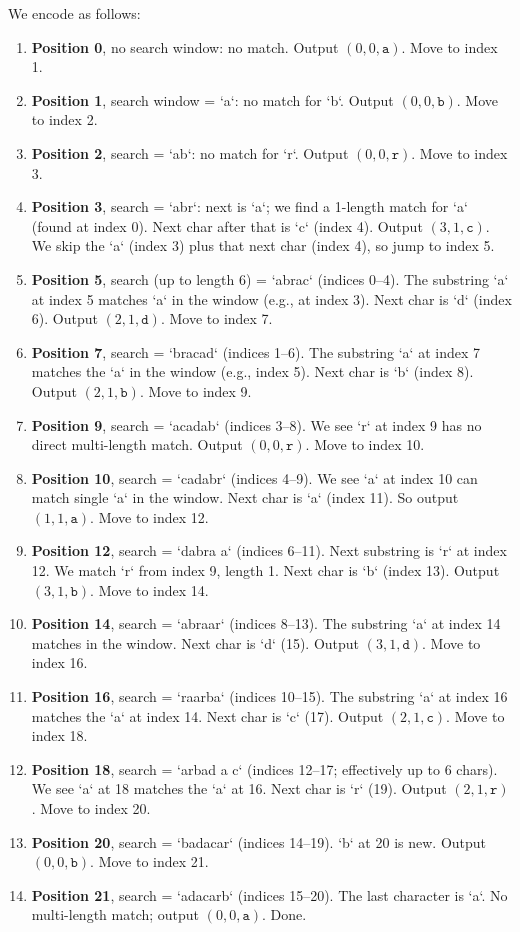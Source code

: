 \documentclass{article}
\begin{document}
We encode as follows:

\begin{enumerate}
  \item \textbf{Position 0}, no search window: no match. Output $(0,0,\texttt{a})$. Move to index 1.
  \item \textbf{Position 1}, search window = `a`: no match for `b`. Output $(0,0,\texttt{b})$. Move to index 2.
  \item \textbf{Position 2}, search = `ab`: no match for `r`. Output $(0,0,\texttt{r})$. Move to index 3.
  \item \textbf{Position 3}, search = `abr`: next is `a`; we find a 1-length match for `a` (found at index 0). Next char after that is `c` (index 4). Output $(3,1,\texttt{c})$. We skip the `a` (index 3) plus that next char (index 4), so jump to index 5.
  \item \textbf{Position 5}, search (up to length 6) = `abrac` (indices 0--4). The substring `a` at index 5 matches `a` in the window (e.g., at index 3). Next char is `d` (index 6). Output $(2,1,\texttt{d})$. Move to index 7.
  \item \textbf{Position 7}, search = `bracad` (indices 1--6). The substring `a` at index 7 matches the `a` in the window (e.g., index 5). Next char is `b` (index 8). Output $(2,1,\texttt{b})$. Move to index 9.
  \item \textbf{Position 9}, search = `acadab` (indices 3--8). We see `r` at index 9 has no direct multi-length match. Output $(0,0,\texttt{r})$. Move to index 10.
  \item \textbf{Position 10}, search = `cadabr` (indices 4--9). We see `a` at index 10 can match single `a` in the window. Next char is `a` (index 11). So output $(1,1,\texttt{a})$. Move to index 12.
  \item \textbf{Position 12}, search = `dabra a` (indices 6--11). Next substring is `r` at index 12. We match `r` from index 9, length 1. Next char is `b` (index 13). Output $(3,1,\texttt{b})$. Move to index 14.
  \item \textbf{Position 14}, search = `abraar` (indices 8--13). The substring `a` at index 14 matches in the window. Next char is `d` (15). Output $(3,1,\texttt{d})$. Move to index 16.
  \item \textbf{Position 16}, search = `raarba` (indices 10--15). The substring `a` at index 16 matches the `a` at index 14. Next char is `c` (17). Output $(2,1,\texttt{c})$. Move to index 18.
  \item \textbf{Position 18}, search = `arbad a c` (indices 12--17; effectively up to 6 chars). We see `a` at 18 matches the `a` at 16. Next char is `r` (19). Output $(2,1,\texttt{r})$. Move to index 20.
  \item \textbf{Position 20}, search = `badacar` (indices 14--19). `b` at 20 is new. Output $(0,0,\texttt{b})$. Move to index 21.
  \item \textbf{Position 21}, search = `adacarb` (indices 15--20). The last character is `a`. No multi-length match; output $(0,0,\texttt{a})$. Done.
\end{enumerate}
\end{document}

